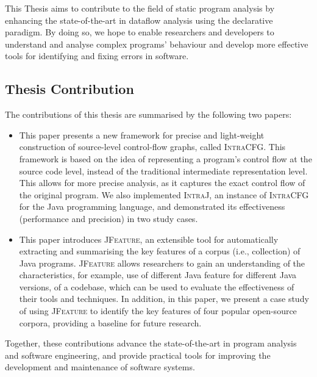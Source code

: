This Thesis aims to contribute to the field of static program analysis 
by enhancing the state-of-the-art in dataflow analysis using the declarative paradigm. 
By doing so, we hope to enable researchers and developers to understand and 
analyse complex programs' behaviour and develop more effective tools for 
identifying and fixing errors in software.



\subsection*{Thesis Contribution}

The contributions of this thesis are summarised by the following two papers:

\begin{itemize}
	\item \paperIref
	This paper presents a new framework for precise and light-weight construction of source-level control-flow 
	graphs, called \textsc{IntraCFG}. This framework is based on the idea of 
	representing a program's control flow at the source code level, instead of 
	the traditional intermediate representation level. This allows for more 
	precise analysis, as it captures the exact control flow of the original program.
    We also implemented \textsc{IntraJ}, an instance of \textsc{IntraCFG} for the Java programming 
	language, and demonstrated its effectiveness (performance and precision) in 
	two study cases.

	\item \paperIIref
	This paper introduces \textsc{JFeature}, an extensible tool for automatically extracting and summarising
	the key features of a corpus (i.e., collection) of Java programs. \textsc{JFeature} 
	allows researchers to gain an understanding of the characteristics, for example,
	use of different Java feature for different Java versions, of a codebase, 
	which can be used to evaluate the effectiveness of their tools and techniques.
	In addition, in this paper, we present a case study of using \textsc{JFeature} to
	identify the key features of four popular open-source corpora, providing a
	baseline for future research.
\end{itemize}

Together, these contributions advance the state-of-the-art in program analysis 
and software engineering, and provide practical tools for improving the development
and maintenance of software systems.
